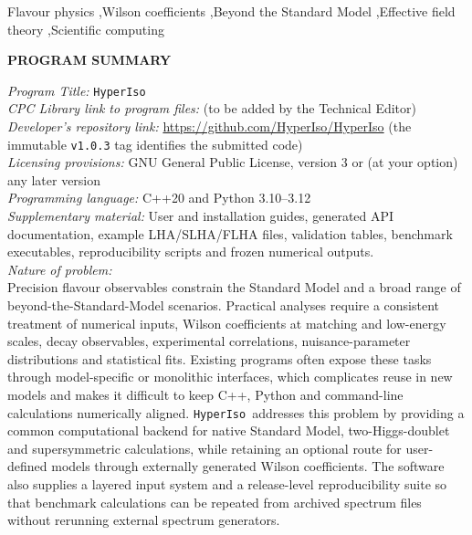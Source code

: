 \documentclass[preprint,11pt]{elsarticle}
\newcommand{\hi}{\texttt{HyperIso}}
\begin{document}
\begin{frontmatter}
\begin{keyword}
Flavour physics \sep Wilson coefficients \sep Beyond the Standard Model \sep Effective field theory \sep Scientific computing
\end{keyword}
\end{frontmatter}



\noindent \textbf{PROGRAM SUMMARY}

\begin{small}
\noindent
{\em Program Title:} \hi~ \\
{\em CPC Library link to program files:} (to be added by the Technical Editor) \\
{\em Developer's repository link:} \url{https://github.com/HyperIso/HyperIso} (the immutable \texttt{v1.0.3} tag identifies the submitted code) \\
{\em Licensing provisions:} GNU General Public License, version 3 or (at your option) any later version \\
{\em Programming language:} C++20 and Python 3.10--3.12 \\
{\em Supplementary material:} User and installation guides, generated API documentation, example LHA/SLHA/FLHA files, validation tables, benchmark executables, reproducibility scripts and frozen numerical outputs. \\
{\em Nature of problem:}\\
Precision flavour observables constrain the Standard Model and a broad range of beyond-the-Standard-Model scenarios. Practical analyses require a consistent treatment of numerical inputs, Wilson coefficients at matching and low-energy scales, decay observables, experimental correlations, nuisance-parameter distributions and statistical fits. Existing programs often expose these tasks through model-specific or monolithic interfaces, which complicates reuse in new models and makes it difficult to keep C++, Python and command-line calculations numerically aligned. \hi~addresses this problem by providing a common computational backend for native Standard Model, two-Higgs-doublet and supersymmetric calculations, while retaining an optional route for user-defined models through externally generated Wilson coefficients. The software also supplies a layered input system and a release-level reproducibility suite so that benchmark calculations can be repeated from archived spectrum files without rerunning external spectrum generators. \\

\end{small}
\end{document}
